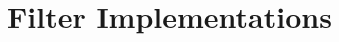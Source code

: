 \documentclass[../zhang_thesis.tex]{subfiles}
\begin{document}


\section{Filter Implementations}


\end{document}
